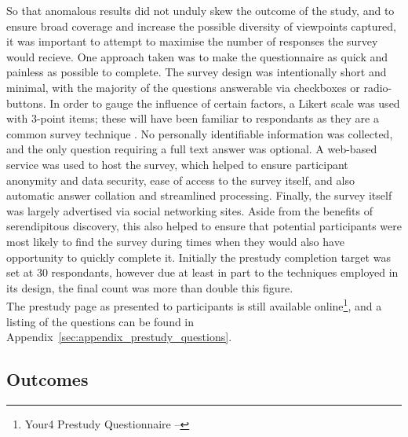 So that anomalous results did not unduly skew the outcome of the study, and to ensure broad coverage and increase the possible diversity of viewpoints captured, it was important to attempt to maximise the number of responses the survey would recieve.
One approach taken was to make the questionnaire as quick and painless as possible to complete.
The survey design was intentionally short and minimal, with the majority of the questions answerable via checkboxes or radio-buttons.
In order to gauge the influence of certain factors, a Likert scale was used with 3-point items; these will have been familiar to respondants as they are a common survey technique \citep{trochim2007}.
No personally identifiable information was collected, and the only question requiring a full text answer was optional. %
A web-based service was used to host the survey, which helped to ensure participant anonymity and data security, ease of access to the survey itself, and also automatic answer collation and streamlined processing.
Finally, the survey itself was largely advertised via social networking sites. Aside from the benefits of serendipitous discovery, this also helped to ensure that potential participants were most likely to find the survey during times when they would also have opportunity to quickly complete it.
Initially the prestudy completion target was set at 30 respondants, however due at least in part to the techniques employed in its design, the final count was more than double this figure.\\ %
The prestudy page as presented to participants is still available online\footnote{Your4 Prestudy Questionnaire -- }, and a listing of the questions can be found in Appendix~\ref{sec:appendix_prestudy_questions}. 


\subsection{Outcomes}

